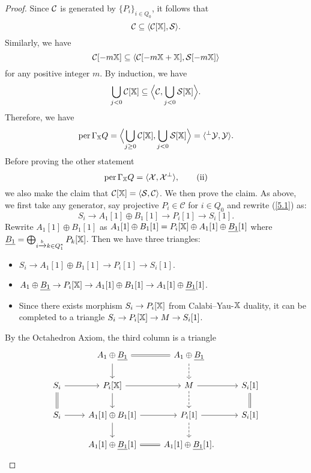 \begin{proof}
  Since $\operatorname{\mathcal{C}}$ is generated by $\{P_i\}_{i \in Q_0}$,
  it follows that
  \[ \operatorname{\mathcal{C}} \subseteq \langle \operatorname{\mathcal{C}}[\mathbb{X}], \mathcal{S} \rangle. \]
  Similarly, we have
  \[\operatorname{\mathcal{C}}[-m\mathbb{X}] \subseteq \langle \operatorname{\mathcal{C}}[-m\mathbb{X}+\mathbb{X}], \mathcal{S}[-m\mathbb{X}] \rangle \]
  for any positive integer $m$.
  By induction, we have
  \[
    \bigcup_{j<0} \operatorname{\mathcal{C}}[\mathbb{X}]
    \subseteq \Bigl\langle \operatorname{\mathcal{C}}, \bigcup_{j<0} \mathcal{S}[\mathbb{X}] \Bigr\rangle.
  \]
  Therefore, we have
  \[
    \operatorname{per}\Gamma_{\mathbb{X}}Q
    = \Bigl\langle \bigcup_{j \geq 0}\operatorname{\mathcal{C}}[\mathbb{X}], \bigcup_{j<0}\mathcal{S}[\mathbb{X}] \Bigr\rangle
    = \langle {}^\bot\mathcal{Y}, \mathcal{Y} \rangle.
  \]
  Before proving the other statement
  \[
    \operatorname{per}\Gamma_{\mathbb{X}}Q = \langle \mathcal{X}, \mathcal{X}^\bot \rangle, \tag{ii}
  \]
  we also make the claim that $\mathcal{C}[\mathbb{X}] = \langle \mathcal{S},\operatorname{\mathcal{C}} \rangle$.
  We then prove the claim.
  As above, we first take any generator,
  say projective $P_i \in \mathcal{C}$ for $i \in Q_0$
  and rewrite (\ref{5.1}) as:
  \begin{equation}\label{5.3}
    S_i \to A_1[1] \oplus B_1[1] \to P_i[1] \to S_i[1].
  \end{equation}
  Rewrite $A_1[1] \oplus B_1[1]$ as
  $A_1[1] \oplus B_1[1] = P_i[\mathbb{X}] \oplus A_1[1] \oplus \underline{B_1}[1]$
  where $\underline{B_1} = \bigoplus_{i\xrightarrow{b} k \in Q_1^*}P_k[\mathbb{X}]$.
  Then we have three triangles:
  \begin{itemize}
    \item $S_i \to A_1[1] \oplus B_1[1] \to P_i[1] \to S_i[1]$.
    \item $A_1 \oplus \underline{B_1} \to P_i[\mathbb{X}]
      \to A_1[1] \oplus B_1[1] \to A_1[1]\oplus \underline{B_1}[1]$.
    \item Since there exists morphism $S_i \to P_i[\mathbb{X}]$
      from Calabi--Yau-$\mathbb{X}$ duality,
      it can be completed to a triangle $S_i \to P_i[\mathbb{X}] \to M \to S_i[1]$.
  \end{itemize}
  By the Octahedron Axiom, the third column is a triangle
  \begin{equation}\label{5.4}
    \begin{tikzcd}
      & A_1 \oplus \underline{B_1} \ar[r, equal] \ar[d]
      & A_1 \oplus \underline{B_1}\ar[d, dashed] \\
      S_i\ar[d, equal] \ar[r] & P_i[\XX]\ar[d] \ar[r]
      & M\ar[d, dashed] \ar[r] & S_i[1] \ar[d, equal] \\
      S_i \ar[r] & A_1[1] \oplus B_1[1] \ar[d] \ar[r]
      & P_i[1] \ar[d, dashed] \ar[r] & S_i[1] \\
      & A_1[1] \oplus \underline{B_1}[1]\ar[r, equal]
      & A_1[1]\oplus \underline{B_1}[1].

\end{tikzcd}
\end{equation}
\end{proof}
